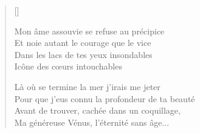 
\settowidth{\versewidth}{Quand fusionnent les rayons de sang de la cathédrale,}
\begin{verse}[\versewidth]


Mon âme assouvie se refuse au précipice \\
Et noie autant le courage que le vice \\
Dans les lacs de tes yeux insondables \\
Icône des cœurs intouchables

Là où se termine la mer j'irais me jeter \\
Pour que j'eus connu la profondeur de ta beauté \\
Avant de trouver, cachée dans un coquillage, \\
Ma généreuse Vénus, l'éternité sans âge...
\end{verse}

\newpage

